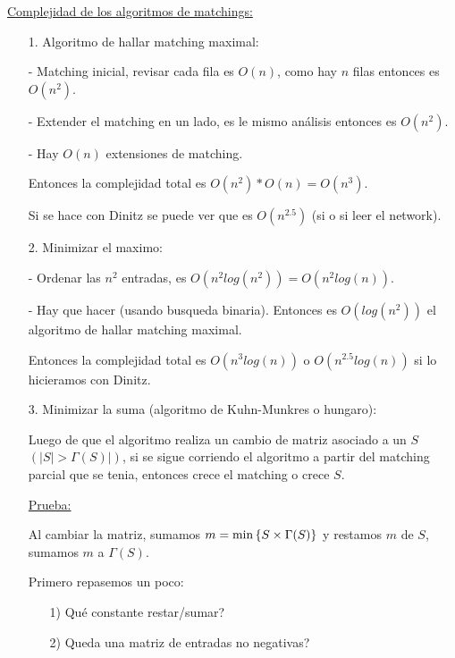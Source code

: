 \documentclass[12pt,a4paper]{article}
\begin{document}
\underline{Complejidad de los algoritmos de matchings:}
\begin{itemize}
    \item [1.] Algoritmo de hallar matching maximal:
    
    - Matching inicial, revisar cada fila es $O(n)$, como hay $n$ filas entonces es $O(n^{2})$.
    
    - Extender el matching en un lado, es le mismo análisis entonces es $O(n^{2})$.
    
    - Hay $O(n)$ extensiones de matching.

    Entonces la complejidad total es $O(n^{2})*O(n) = O(n^{3})$.

    Si se hace con Dinitz se puede ver que es $O(n^{2.5})$ (si o si leer el network).

    \item [2.] Minimizar el maximo:
    
    - Ordenar las $n^{2}$ entradas, es $O(n^{2}log(n^{2})) = O(n^{2}log(n))$.

    - Hay que hacer (usando busqueda binaria). Entonces es $O(log(n^{2}))$ el algoritmo 
    de hallar matching maximal. 

    Entonces la complejidad total es $O(n^{3}log(n))$ o $O(n^{2.5}log(n))$ si lo hicieramos con Dinitz.

    \item [3.] Minimizar la suma (algoritmo de Kuhn-Munkres o hungaro):
    \begin{lema} Luego de que el algoritmo realiza un cambio de matriz asociado a un $S$
        $(|S| > \Gamma(S)|)$, si se sigue corriendo el algoritmo a partir del matching 
        parcial que se tenia, entonces crece el matching o crece $S$.
    \end{lema}
    \underline{Prueba:}
    \medskip

    Al cambiar la matriz, sumamos $m = \min \left\lbrace S \times \Gamma(S) \right\rbrace$ y restamos 
    $m$ de $S$, sumamos $m$ a $\Gamma(S)$.

    Primero repasemos un poco:
    \begin{itemize}
        \item [1)] Qué constante restar/sumar?
        \item [2)] Queda una matriz de entradas no negativas?
    \end{itemize}


\end{itemize}
\end{document}

